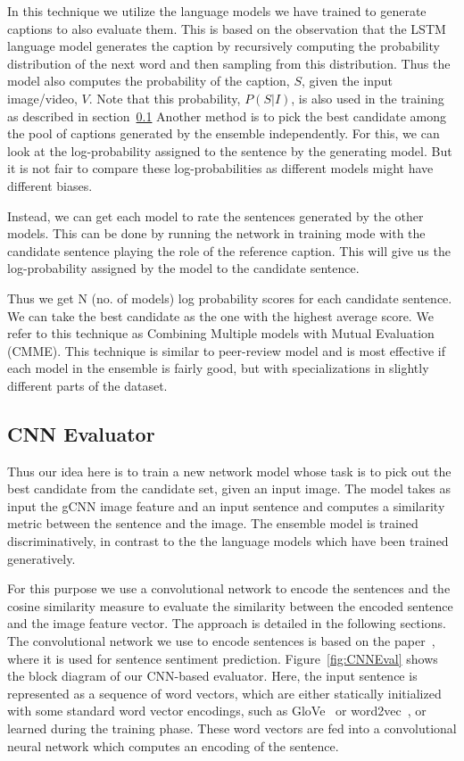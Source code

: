 In this technique we utilize the language models we have trained to generate
captions to also evaluate them.
This is based on the observation that the LSTM language model generates the
caption by recursively computing the probability distribution of the next word
and then sampling from this distribution.
Thus the model also computes the probability of the caption, $S$, given the
input image/video, $V$.
Note that this probability, $P(S|I)$, is also used in the training as described
in section~\ref{}
Another method is to pick the best candidate among the pool of captions
generated by the ensemble independently.
For this, we can look at the log-probability assigned to the sentence by the
generating model.
But it is not fair to compare these log-probabilities as different models might
have different biases.

Instead, we can get each model to rate the sentences generated by the other
models.
This can be done by running the network in training mode with the candidate
sentence playing the role of the reference caption.
This will give us the log-probability assigned by the model to the candidate
sentence.

Thus we get N (no. of models) log probability scores for each candidate
sentence.
We can take the best candidate as the one with the highest average score.
We refer to this technique as Combining Multiple models with Mutual Evaluation
(CMME).
This technique is similar to peer-review model and is most effective if each
model in the ensemble is fairly good, but with specializations in slightly
different parts of the dataset.

\subsection{CNN Evaluator}

Thus our idea here is to train a new network model whose task is to pick out the
best candidate from the candidate set, given an input image. 
The model takes as input the gCNN image feature and an input sentence and
computes a similarity metric between the sentence and the image. 
The ensemble model is trained discriminatively, in contrast to the the language
models which have been trained generatively.

For this purpose we use a convolutional network to encode the sentences and the
cosine similarity measure to evaluate the similarity between the encoded
sentence and the image feature vector. 
The approach is detailed in the following sections.
The convolutional network we use to encode sentences is based on the
paper~\cite{kim:2014:CNNsent}, where it is used for sentence sentiment
prediction.
Figure~\ref{fig:CNNEval} shows the block diagram of our CNN-based
evaluator.  
Here, the input sentence is represented as a sequence of word vectors,
which are either statically initialized with some standard word vector
encodings, such as GloVe~\cite{pennington2014glove} or
word2vec~\cite{mikolov2013distributed}, or learned during the training
phase.
These word vectors are fed into a convolutional neural network which
computes an encoding of the sentence.

